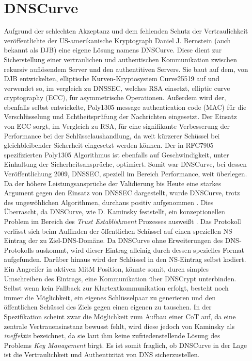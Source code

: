 \section{DNSCurve}

Aufgrund der schlechten Akzeptanz und dem fehlenden Schutz der Vertraulichkeit veröffentlichte der US-amerikanische Kryptograph Daniel J. Bernstein (auch bekannt als DJB) eine eigene Lösung namens DNSCurve. Diese dient zur Sicherstellung einer vertraulichen und authentischen Kommunikation zwischen rekursiv auflösendem Server und den authentitiven Servers. Sie baut auf dem, von DJB entwickelten, elliptische Kurven-Kryptosystem Curve25519 auf und verwendet so, im vergleich zu DNSSEC, welches RSA einsetzt, elliptic curve cryptography (ECC), für asymmetrische Operationen. Außerdem wird der, ebenfalls selbst entwickelte, Poly1305 message authentication code (MAC) für die Verschlüsselung und Echtheitsprüfung der Nachrichten eingesetzt. Der Einsatz von ECC sorgt, im Vergleich zu RSA, für eine signifikante Verbesserung der Performance bei der Schlüsselaushandlung, da weit kürzerer Schüssel bei gleichbleibender Sicherheit eingesetzt werden können\cite{Gupta2002}. Der in RFC7905 spezifizierten Poly1305 Algorithmus ist ebenfalls auf Geschwindigkeit, unter Einhaltung der Sicherheitsansprüche, optimiert\cite{Bernstein2005}. Somit war DNSCurve, bei dessen Veröffentlichung 2009, DNSSEC, speziell im Bereich Performance, weit überlegen. Da der höhere Leistungsansprüche der Validierung bis Heute eine starkes Argument gegen den Einsatz von DNSSEC dargestellt, wurde DNSCurve, trotz des ungewöhlichen Algorithmen, durchaus positiv aufgenommen \cite{Henry2013}. Dies Überrascht, da DNSCurve, wie D. Kaminsky feststellt, ein konzeptionellen Problem im Bereich des \textit{Trust Establishment} Prozesses ausweißt \cite{Kaminsky2011}. Das Protokoll verlässt sich beim Auffinden der öffentlichen Schüssel auf einen speziellen NS-Eintrag der zu Ziel-DNS-Domäne. Da DNSCurve ohne Erweiterungen des DNS-Protokolls auskommt, wird dieser Eintrag alleinig durch dessen spezielles Format aufgefunden. Darüber hinaus wird der Schlüssel in den NS-Eintrag selbst kodiert. Ein Angreifer in aktiven MitM Position, könnte somit, durch simples Umschreiben des Eintrags, eine Kommunikation über DNSCrypt unterbinden. Selbst wenn kein Fallback zur Klartextkommunikation erfolgt, besteht noch immer die Möglichkeit, ein eigenes Schlüsselpaar zu generieren und den öffentlichen Schüssel des Ziels gegen einen eigenen zu tauschen. In der Spezifikation scheint zwar die Möglichkeit zum Aufbau einer CoT auf, da eine zentrale Vertrauensinstanz bewusst fehlt, wird diese jedoch von Kaminsky als \textit{ineffektiv} bezeichnet, da sie laut ihm keine zufriedenstellende Lösung des Problems \textit{Key Management} birgt. Es ist somit fraglich, ob DNSCurve in der Lage ist die Vertraulichkeit und Authentizität von DNS sicherzustellen.  


